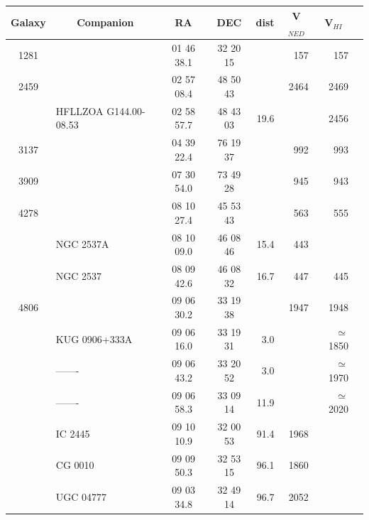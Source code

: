 \documentclass{aa}
\newcounter{dummyyoyo}
\begin{document}
%

\setcounter{dummyyoyo}{\thetable}
\begin{center}
\begin{table}
\begin{center}
\begin{tabular}{|c|l|c|c|r|r|r|r}
\hline
Galaxy & \multicolumn{1}{c|}{Companion} & RA & DEC & \multicolumn{1}{c|}{dist} & \multicolumn{1}{c|}{V$_{NED}$} & \multicolumn{1}{c|}{V$_{HI}$} \\
\hline
\hline
1281  &                          & 01 46 38.1 & 32 20 15   &        &   157  &   157\\
\hline
2459  &                          & 02 57 08.4 & 48 50 43   &        &   2464 &   2469\\
      & HFLLZOA G144.00-08.53    & 02 58 57.7 & 48 43 03   &   19.6 &        &   2456\\
\hline
3137  &                          & 04 39 22.4 & 76 19 37   &        &   992  &   993\\
\hline
3909  &                          & 07 30 54.0 & 73 49 28   &        &   945  &   943\\
\hline
4278  &                          & 08 10 27.4 & 45 53 43   &        &   563  &   555\\
      & NGC 2537A                & 08 10 09.0 & 46 08 46   &   15.4 &   443  &   \\
      & NGC 2537                 & 08 09 42.6 & 46 08 32   &   16.7 &   447  &   445\\
\hline
4806  &                          & 09 06 30.2 & 33 19 38   &        &   1947 &   1948\\
      & KUG 0906+333A            & 09 06 16.0 & 33 19 31   &   3.0  &        &   $\simeq$1850\\
      & -------                  & 09 06 43.2 & 33 20 52   &   3.0  &        &   $\simeq$1970\\
      & -------                  & 09 06 58.3 & 33 09 14   &   11.9 &        &   $\simeq$2020\\
      & IC 2445                  & 09 10 10.9 & 32 00 53   &   91.4 &   1968 & \\
      & CG 0010                  & 09 09 50.3 & 32 53 15   &   96.1 &   1860 & \\
      & UGC 04777                & 09 03 34.8 & 32 49 14   &   96.7 &   2052 & \\

\end{tabular}
\end{center}
\end{table}
\end{center}
\end{document}
